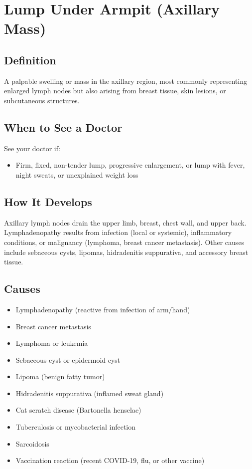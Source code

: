 \chapter{Lump Under Armpit (Axillary Mass)}

\section*{Definition}
A palpable swelling or mass in the axillary region, most commonly representing enlarged lymph nodes but also arising from breast tissue, skin lesions, or subcutaneous structures.

\section*{When to See a Doctor}
See your doctor if:
\begin{itemize}
  \item Firm, fixed, non-tender lump, progressive enlargement, or lump with fever, night sweats, or unexplained weight loss
\end{itemize}

\section*{How It Develops}
Axillary lymph nodes drain the upper limb, breast, chest wall, and upper back. Lymphadenopathy results from infection (local or systemic), inflammatory conditions, or malignancy (lymphoma, breast cancer metastasis). Other causes include sebaceous cysts, lipomas, hidradenitis suppurativa, and accessory breast tissue.

\section*{Causes}
\begin{itemize}
  \item Lymphadenopathy (reactive from infection of arm/hand)
  \item Breast cancer metastasis
  \item Lymphoma or leukemia
  \item Sebaceous cyst or epidermoid cyst
  \item Lipoma (benign fatty tumor)
  \item Hidradenitis suppurativa (inflamed sweat gland)
  \item Cat scratch disease (Bartonella henselae)
  \item Tuberculosis or mycobacterial infection
  \item Sarcoidosis
  \item Vaccination reaction (recent COVID-19, flu, or other vaccine)
\end{itemize}

